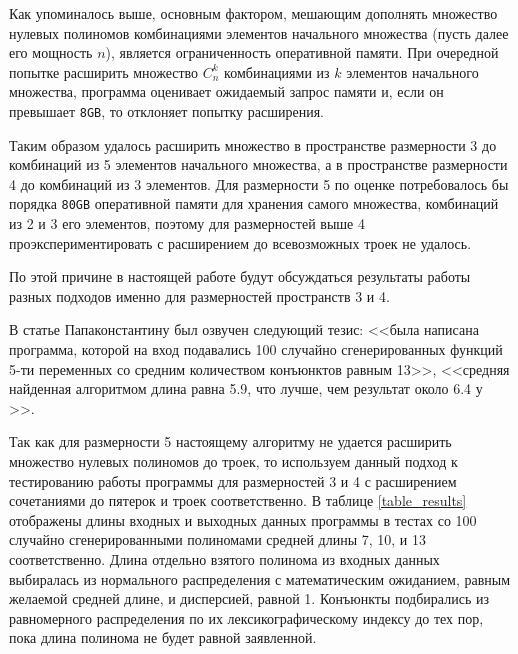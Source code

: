 \documentclass[a4paper,12pt,titlepage]{article}
\begin{document}
Как упоминалось выше, основным фактором, мешающим дополнять множество нулевых полиномов комбинациями элементов начального множества (пусть далее его мощность $ n $), является ограниченность оперативной памяти. При очередной попытке расширить множество $ C_n^k $ комбинациями из $ k $ элементов начального множества, программа оценивает ожидаемый запрос памяти и, если он превышает \texttt{8GB}, то отклоняет попытку расширения.

Таким образом удалось расширить множество в пространстве размерности 3 до комбинаций из 5 элементов начального множества, а в пространстве размерности 4 до комбинаций из 3 элементов. Для размерности 5 по оценке потребовалось бы порядка \texttt{80GB} оперативной памяти для хранения самого множества, комбинаций из 2 и 3 его элементов, поэтому для размерностей выше 4 проэкспериментировать с расширением до всевозможных троек не удалось.

По этой причине в настоящей работе будут обсуждаться результаты работы разных подходов именно для размерностей пространств 3 и 4.

В статье Папаконстантину \cite{513100} был озвучен следующий тезис: <<была написана программа, которой на вход подавались 100 случайно сгенерированных функций 5-ти переменных со средним количеством конъюнктов равным 13>>, <<средняя найденная алгоритмом длина равна 5.9, что лучше, чем результат около 6.4 у \cite{beat1, beat2}>>.

Так как для размерности 5 настоящему алгоритму не удается расширить множество нулевых полиномов до троек, то используем данный подход к тестированию работы программы для размерностей 3 и 4 с расширением сочетаниями до пятерок и троек соответственно. В таблице \ref{table_results} отображены длины входных и выходных данных программы в тестах со 100 случайно сгенерированными полиномами средней длины 7, 10, и 13 соответственно. Длина отдельно взятого полинома из входных данных выбиралась из нормального распределения с математическим ожиданием, равным желаемой средней длине, и дисперсией, равной 1. Конъюнкты подбирались из равномерного распределения по их лексикографическому индексу до тех пор, пока длина полинома не будет равной заявленной.
\end{document}
